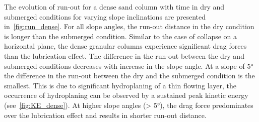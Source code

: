 The evolution of run-out for a dense sand column with time in dry and submerged 
conditions for varying slope inclinations are presented 
in~\cref{fig:run_dense}. For all slope angles, the run-out distance in the dry 
condition is longer than the submerged condition. Similar to the case of 
collapse on a horizontal plane, the dense granular columns experience 
significant drag forces than the lubrication effect. The difference in the 
run-out between the dry and submerged conditions decreases with increase in the 
slope angle. At a slope of 5\si{\degree} the difference in the run-out between 
the dry and the submerged condition is the smallest. This is due to significant 
hydroplaning of a thin flowing layer, the occurrence of hydroplaning can be 
observed by a sustained peak kinetic energy (see~\cref{fig:KE_dense}). At 
higher slope angles (> 5\si{\degree}), the drag force predominates over the 
lubrication effect and results in shorter run-out distance. 
